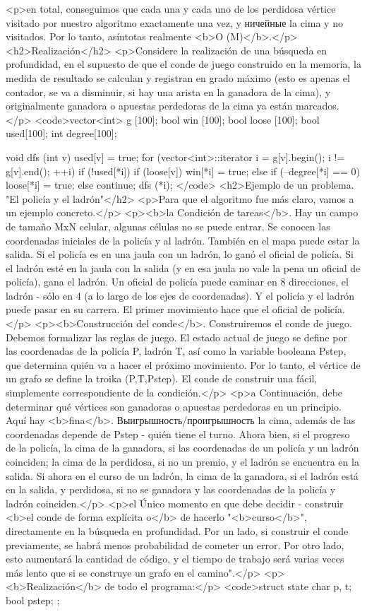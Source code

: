 <p>en total, conseguimos que cada una y cada uno de los perdidosa vértice visitado por nuestro algoritmo exactamente una vez, y ничейные la cima y no visitados. Por lo tanto, asíntotas realmente <b>O (M)</b>.</p>
<h2>Realización</h2>
<p>Considere la realización de una búsqueda en profundidad, en el supuesto de que el conde de juego construido en la memoria, la medida de resultado se calculan y registran en grado máximo (esto es apenas el contador, se va a disminuir, si hay una arista en la ganadora de la cima), y originalmente ganadora o apuestas perdedoras de la cima ya están marcados.</p>
<code>vector<int> g [100];
bool win [100];
bool loose [100];
bool used[100];
int degree[100];

void dfs (int v) {
used[v] = true;
for (vector<int>::iterator i = g[v].begin(); i != g[v].end(); ++i)
if (!used[*i]) {
if (loose[v])
win[*i] = true;
else if (--degree[*i] == 0)
loose[*i] = true;
else
continue;
dfs (*i);
}
}</code>
<h2>Ejemplo de un problema. "El policía y el ladrón"</h2>
<p>Para que el algoritmo fue más claro, vamos a un ejemplo concreto.</p>
<p><b>la Condición de tareas</b>. Hay un campo de tamaño MxN celular, algunas células no se puede entrar. Se conocen las coordenadas iniciales de la policía y al ladrón. También en el mapa puede estar la salida. Si el policía es en una jaula con un ladrón, lo ganó el oficial de policía. Si el ladrón esté en la jaula con la salida (y en esa jaula no vale la pena un oficial de policía), gana el ladrón. Un oficial de policía puede caminar en 8 direcciones, el ladrón - sólo en 4 (a lo largo de los ejes de coordenadas). Y el policía y el ladrón puede pasar en su carrera. El primer movimiento hace que el oficial de policía.</p>
<p><b>Construcción del conde</b>. Construiremos el conde de juego. Debemos formalizar las reglas de juego. El estado actual de juego se define por las coordenadas de la policía P, ladrón T, así como la variable booleana Pstep, que determina quién va a hacer el próximo movimiento. Por lo tanto, el vértice de un grafo se define la troika (P,T,Pstep). El conde de construir una fácil, simplemente correspondiente de la condición.</p>
<p>a Continuación, debe determinar qué vértices son ganadoras o apuestas perdedoras en un principio. Aquí hay <b>fina</b>. Выигрышность/проигрышность la cima, además de las coordenadas depende de Pstep - quién tiene el turno. Ahora bien, si el progreso de la policía, la cima de la ganadora, si las coordenadas de un policía y un ladrón coinciden; la cima de la perdidosa, si no un premio, y el ladrón se encuentra en la salida. Si ahora en el curso de un ladrón, la cima de la ganadora, si el ladrón está en la salida, y perdidosa, si no se ganadora y las coordenadas de la policía y ladrón coinciden.</p>
<p>el Único momento en que debe decidir - construir <b>el conde de forma explícita o</b> de hacerlo "<b>curso</b>", directamente en la búsqueda en profundidad. Por un lado, si construir el conde previamente, se habrá menos probabilidad de cometer un error. Por otro lado, esto aumentará la cantidad de código, y el tiempo de trabajo será varias veces más lento que si se construye un grafo en el camino".</p>
<p><b>Realización</b> de todo el programa:</p>
<code>struct state {
char p, t;
bool pstep;
};

